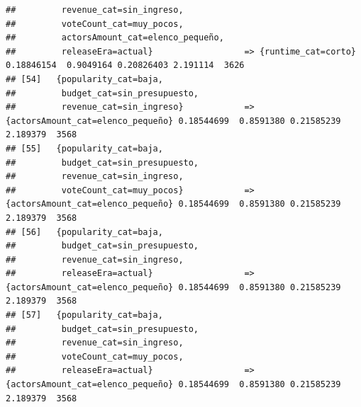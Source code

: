 \documentclass[
]{article}
\begin{document}
\begin{verbatim}
##         revenue_cat=sin_ingreso,                                                                                                
##         voteCount_cat=muy_pocos,                                                                                                
##         actorsAmount_cat=elenco_pequeño,                                                                                        
##         releaseEra=actual}                  => {runtime_cat=corto}               0.18846154  0.9049164 0.20826403 2.191114  3626
## [54]   {popularity_cat=baja,                                                                                                    
##         budget_cat=sin_presupuesto,                                                                                             
##         revenue_cat=sin_ingreso}            => {actorsAmount_cat=elenco_pequeño} 0.18544699  0.8591380 0.21585239 2.189379  3568
## [55]   {popularity_cat=baja,                                                                                                    
##         budget_cat=sin_presupuesto,                                                                                             
##         revenue_cat=sin_ingreso,                                                                                                
##         voteCount_cat=muy_pocos}            => {actorsAmount_cat=elenco_pequeño} 0.18544699  0.8591380 0.21585239 2.189379  3568
## [56]   {popularity_cat=baja,                                                                                                    
##         budget_cat=sin_presupuesto,                                                                                             
##         revenue_cat=sin_ingreso,                                                                                                
##         releaseEra=actual}                  => {actorsAmount_cat=elenco_pequeño} 0.18544699  0.8591380 0.21585239 2.189379  3568
## [57]   {popularity_cat=baja,                                                                                                    
##         budget_cat=sin_presupuesto,                                                                                             
##         revenue_cat=sin_ingreso,                                                                                                
##         voteCount_cat=muy_pocos,                                                                                                
##         releaseEra=actual}                  => {actorsAmount_cat=elenco_pequeño} 0.18544699  0.8591380 0.21585239 2.189379  3568

\end{verbatim}
\end{document}
